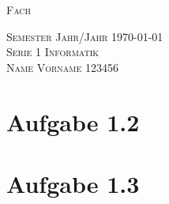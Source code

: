 \documentclass[a4paper, fontsize=10pt]{scrartcl}
\begin{document}
\begin{center} \Large  \textsc{{\color{MidnightBlue}Fach}} \end{center}
\textsc{Semester Jahr/Jahr} \hfill \today \\[0.2 cm]
\Large \textsc{Serie 1} \hfill \large \textsc{Informatik}\\[0.2cm]
\small {\color{MidnightBlue}\textsc{Name Vorname} \quad \textsc{123456}}

	\section*{Aufgabe 1.2}
		

	\section*{Aufgabe 1.3}
		
\end{document}
